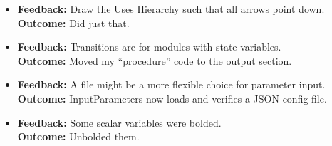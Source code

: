 \documentclass{article}
\begin{document}
\begin{itemize}
    \item \textbf{Feedback: }Draw the Uses Hierarchy such that all arrows point down.  \\
    \textbf{Outcome: }Did just that. 
    \item \textbf{Feedback: }Transitions are for modules with state variables.  \\
    \textbf{Outcome: }Moved my ``procedure'' code to the output section. 
    \item \textbf{Feedback: }A file might be a more flexible choice for parameter input.  \\
    \textbf{Outcome: }InputParameters now loads and verifies a JSON config file. 
    \item \textbf{Feedback: }Some scalar variables were bolded.  \\
    \textbf{Outcome: }Unbolded them. 
\end{itemize}
\end{document}
